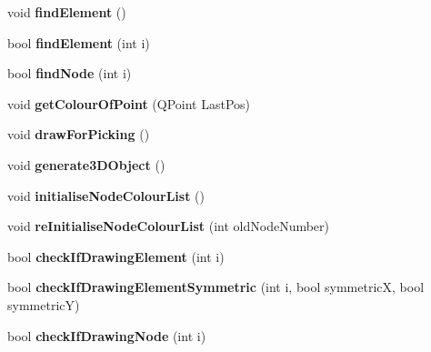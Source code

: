 \begin{DoxyCompactItemize}
\item 
\hypertarget{classGLWidget_a7fe217738ad7d4c54caa575068641234}{}void {\bfseries find\+Element} ()\label{classGLWidget_a7fe217738ad7d4c54caa575068641234}

\item 
\hypertarget{classGLWidget_aa1c349f897d0fee1163abba8fd39995c}{}bool {\bfseries find\+Element} (int i)\label{classGLWidget_aa1c349f897d0fee1163abba8fd39995c}

\item 
\hypertarget{classGLWidget_a7ff762be5c3562616b6cc4bc6d6b6683}{}bool {\bfseries find\+Node} (int i)\label{classGLWidget_a7ff762be5c3562616b6cc4bc6d6b6683}

\item 
\hypertarget{classGLWidget_afc09ab8fa7a8163ca1b69e7953e33dc4}{}void {\bfseries get\+Colour\+Of\+Point} (Q\+Point Last\+Pos)\label{classGLWidget_afc09ab8fa7a8163ca1b69e7953e33dc4}

\item 
\hypertarget{classGLWidget_a218fadfeda519fd8a120b702f04771c8}{}void {\bfseries draw\+For\+Picking} ()\label{classGLWidget_a218fadfeda519fd8a120b702f04771c8}

\item 
\hypertarget{classGLWidget_a1f66af8462807ed77b878cba3e60bbb9}{}void {\bfseries generate3\+D\+Object} ()\label{classGLWidget_a1f66af8462807ed77b878cba3e60bbb9}

\item 
\hypertarget{classGLWidget_a30be9e529d717552be70cbad097d99e8}{}void {\bfseries initialise\+Node\+Colour\+List} ()\label{classGLWidget_a30be9e529d717552be70cbad097d99e8}

\item 
\hypertarget{classGLWidget_a5dd3852a3226519f5b94389385168da2}{}void {\bfseries re\+Initialise\+Node\+Colour\+List} (int old\+Node\+Number)\label{classGLWidget_a5dd3852a3226519f5b94389385168da2}

\item 
\hypertarget{classGLWidget_a8597de4600272fb1720641fd1990f153}{}bool {\bfseries check\+If\+Drawing\+Element} (int i)\label{classGLWidget_a8597de4600272fb1720641fd1990f153}

\item 
\hypertarget{classGLWidget_a95a5dc2578aeaf9df7127c0af7d1a531}{}bool {\bfseries check\+If\+Drawing\+Element\+Symmetric} (int i, bool symmetric\+X, bool symmetric\+Y)\label{classGLWidget_a95a5dc2578aeaf9df7127c0af7d1a531}

\item 
\hypertarget{classGLWidget_a4e843eda050d818414f6c722f806cf88}{}bool {\bfseries check\+If\+Drawing\+Node} (int i)\label{classGLWidget_a4e843eda050d818414f6c722f806cf88}


\end{DoxyCompactItemize}
